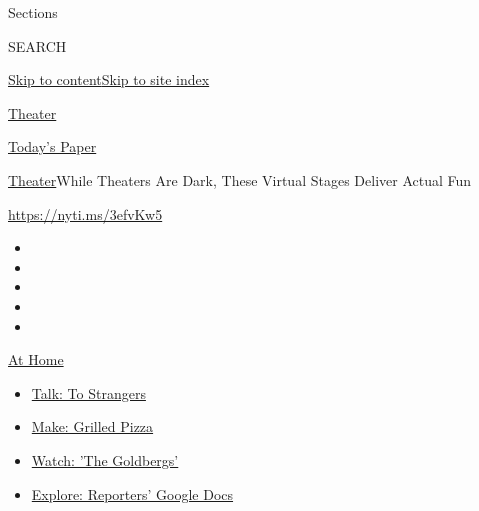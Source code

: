Sections

SEARCH

\protect\hyperlink{site-content}{Skip to
content}\protect\hyperlink{site-index}{Skip to site index}

\href{https://www.nytimes3xbfgragh.onion/section/theater}{Theater}

\href{https://myaccount.nytimes3xbfgragh.onion/auth/login?response_type=cookie\&client_id=vi}{}

\href{https://www.nytimes3xbfgragh.onion/section/todayspaper}{Today's
Paper}

\href{/section/theater}{Theater}\textbar{}While Theaters Are Dark, These
Virtual Stages Deliver Actual Fun

\href{https://nyti.ms/3efvKw5}{https://nyti.ms/3efvKw5}

\begin{itemize}
\item
\item
\item
\item
\item
\end{itemize}

\href{https://www.nytimes3xbfgragh.onion/spotlight/at-home?action=click\&pgtype=Article\&state=default\&region=TOP_BANNER\&context=at_home_menu}{At
Home}

\begin{itemize}
\tightlist
\item
  \href{https://www.nytimes3xbfgragh.onion/2020/08/03/well/family/the-benefits-of-talking-to-strangers.html?action=click\&pgtype=Article\&state=default\&region=TOP_BANNER\&context=at_home_menu}{Talk:
  To Strangers}
\item
  \href{https://www.nytimes3xbfgragh.onion/2020/08/01/at-home/coronavirus-make-pizza-on-a-grill.html?action=click\&pgtype=Article\&state=default\&region=TOP_BANNER\&context=at_home_menu}{Make:
  Grilled Pizza}
\item
  \href{https://www.nytimes3xbfgragh.onion/2020/07/31/arts/television/goldbergs-abc-stream.html?action=click\&pgtype=Article\&state=default\&region=TOP_BANNER\&context=at_home_menu}{Watch:
  'The Goldbergs'}
\item
  \href{https://www.nytimes3xbfgragh.onion/interactive/2020/at-home/even-more-reporters-editors-diaries-lists-recommendations.html?action=click\&pgtype=Article\&state=default\&region=TOP_BANNER\&context=at_home_menu}{Explore:
  Reporters' Google Docs}
\end{itemize}


